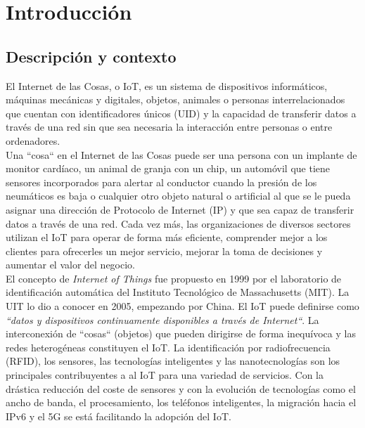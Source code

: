 \chapter{Introducción}

\section{Descripción y contexto}

{\color{blue}

El Internet de las Cosas, o IoT, es un sistema de dispositivos informáticos, máquinas mecánicas y digitales, objetos, animales o personas interrelacionados que cuentan con identificadores únicos (UID) y la capacidad de transferir datos a través de una red sin que sea necesaria la interacción entre personas o entre ordenadores. \cite{serpanos2018internet} \\

Una ``cosa`` en el Internet de las Cosas puede ser una persona con un implante de monitor cardíaco, un animal de granja con un chip, un automóvil que tiene sensores incorporados para alertar al conductor cuando la presión de los neumáticos es baja o cualquier otro objeto natural o artificial al que se le pueda asignar una dirección de Protocolo de Internet (IP) y que sea capaz de transferir datos a través de una red. Cada vez más, las organizaciones de diversos sectores utilizan el IoT para operar de forma más eficiente, comprender mejor a los clientes para ofrecerles un mejor servicio, mejorar la toma de decisiones y aumentar el valor del negocio. \\


El concepto de \textit{Internet of Things} fue propuesto en 1999 por el laboratorio de identificación automática del Instituto Tecnológico de Massachusetts (MIT). La UIT lo dio a conocer en 2005, empezando por China. El IoT puede definirse como \textit{``datos y dispositivos continuamente disponibles a través de Internet``}. La interconexión de ``cosas`` (objetos) que pueden dirigirse de forma inequívoca y las redes heterogéneas constituyen el IoT. La identificación por radiofrecuencia (RFID), los sensores, las tecnologías inteligentes y las nanotecnologías son los principales contribuyentes a al IoT para una variedad de servicios. Con la drástica reducción del coste de sensores y con la evolución de tecnologías como el ancho de banda, el procesamiento, los teléfonos inteligentes, la migración hacia el IPv6 y el 5G se está facilitando la adopción del IoT.\\

}
